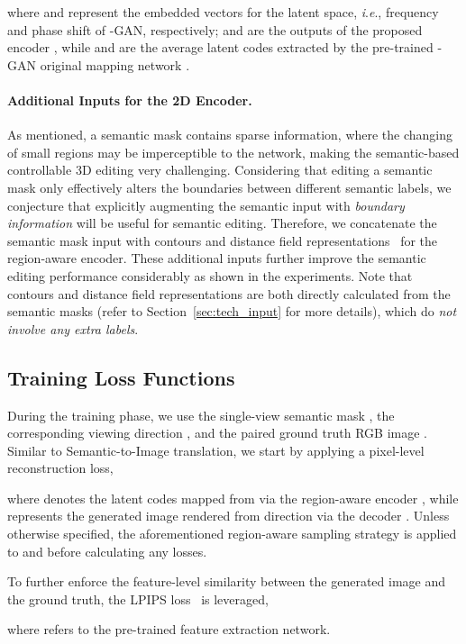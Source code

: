 \documentclass[runningheads]{llncs}
\newcommand{\ie}{\textit{i}.\textit{e}.}
\begin{document}
where  and  represent the embedded vectors for the  latent space, \ie, frequency and phase shift of -GAN, respectively;  and  are the outputs of the proposed encoder , while  and  are the average latent codes extracted by the pre-trained -GAN original mapping network .

\paragraph{\textbf{Additional Inputs for the 2D Encoder.}} As mentioned, a semantic mask contains sparse information, where the changing of small regions may be imperceptible to the network, making the semantic-based controllable 3D editing very challenging. Considering that editing a semantic mask only effectively alters the boundaries between different semantic labels, we conjecture that explicitly augmenting the semantic input with \emph{boundary information} will be useful for semantic editing. Therefore, we concatenate the semantic mask input with contours and distance field representations~\cite{chen2018sketchygan} for the region-aware encoder. These additional inputs further improve the semantic editing performance considerably as shown in the experiments. Note that contours and distance field representations are both directly calculated from the semantic masks (refer to Section~\ref{sec:tech_input} for more details), which do \emph{not involve any extra labels}.


\subsection{Training Loss Functions}
During the training phase, we use the single-view semantic mask , the corresponding viewing direction , and the paired ground truth RGB image . Similar to Semantic-to-Image translation, we start by applying a pixel-level reconstruction loss,

where  denotes the latent codes mapped from  via the region-aware encoder , while  represents the generated image rendered from direction  via the decoder . Unless otherwise specified, the aforementioned region-aware sampling strategy is applied to  and  before calculating any losses. 

To further enforce the feature-level similarity between the generated image and the ground truth, the LPIPS loss~\cite{zhang2018unreasonable} is leveraged, 

where  refers to the pre-trained feature extraction network.
\end{document}
